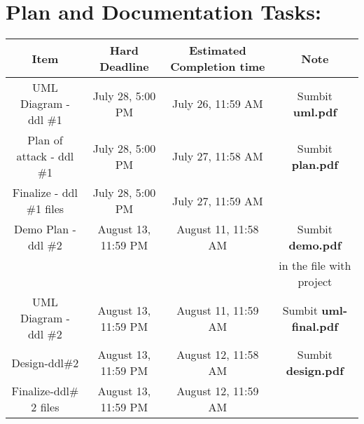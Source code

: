 \documentclass[10pt]{article}
\begin{document}
\parindent=0pt

\newcommand{\colorP}[1]{\colorbox{pink}{#1}}
\newcommand{\colorY}[1]{\colorbox{yellow}{#1}}
\newcommand{\Strategy}{\underline{Strategy} }
\newcommand{\Template}{\underline{Template} }
\newcommand{\Decorator}{\underline{Decorator} }



\section*{Plan and Documentation Tasks:}
\begin{tabular}{|c|c|c|c|}\hline
Item & Hard Deadline & Estimated Completion time & Note \\\hline
UML Diagram - ddl \#1 & July 28, 5:00 PM & July 26, 11:59 AM & Sumbit \textbf{uml.pdf}\\\hline
Plan of attack - ddl \#1 & July 28, 5:00 PM & July 27, 11:58 AM & Sumbit \textbf{plan.pdf}\\\hline
Finalize - ddl \#1 files& July 28, 5:00 PM & July 27, 11:59 AM &\\\hline
Demo Plan - ddl \#2 & August 13, 11:59 PM & August 11, 11:58 AM & Sumbit \textbf{demo.pdf} \\
&&&in the file with project\\\hline
UML Diagram - ddl \#2 & August 13, 11:59 PM & August 11, 11:59 AM & Sumbit \textbf{uml-final.pdf}\\\hline
Design-ddl\#2 & August 13, 11:59 PM & August 12, 11:58 AM & Sumbit \textbf{design.pdf}\\\hline
Finalize-ddl\# 2 files & August 13, 11:59 PM & August 12, 11:59 AM & \\\hline
\end{tabular}
\end{document}
